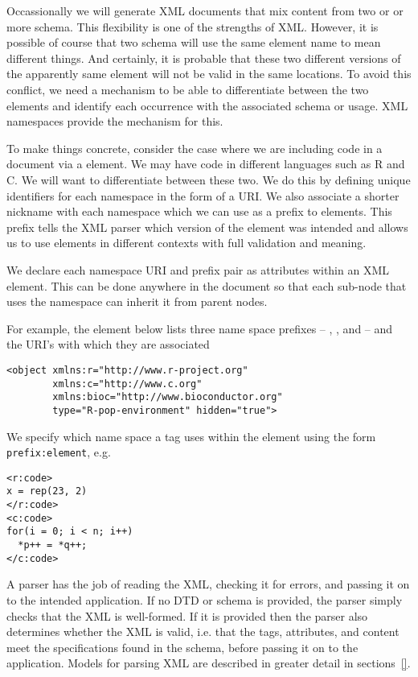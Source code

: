 Occassionally we will generate XML documents that mix content from two
or or more schema.  This flexibility is one of the strengths of XML.
However, it is possible of course that two schema will use the same
element name to mean different things.  And certainly, it is probable
that these two different versions of the apparently same element will
not be valid in the same locations.  To avoid this conflict, we need a
mechanism to be able to differentiate between the two elements and
identify each occurrence with the associated schema or usage.  XML
namespaces provide the mechanism for this.

To make things concrete, consider the case where we are including code
in a document via a  element.  We may have code in
different languages such as R and C.  We will want to differentiate
between these two.  We do this by defining unique identifiers for each
namespace in the form of a URI.  We also associate a shorter nickname
with each namespace which we can use as a prefix to elements.  This
prefix tells the XML parser which version of the element was intended
and allows us to use elements in different contexts with full
validation and meaning.

We declare each namespace URI and prefix pair as attributes within an
XML element.  This can be done anywhere in the document so that each
sub-node that uses the namespace can inherit it from parent nodes.

For example, the  element below lists three
name space prefixes -- , , and  -- and
the URI's with which they are associated
\begin{verbatim}
<object xmlns:r="http://www.r-project.org" 
        xmlns:c="http://www.c.org" 
        xmlns:bioc="http://www.bioconductor.org" 
        type="R-pop-environment" hidden="true">
\end{verbatim}
We specify which name space a tag uses within the 
element
using the form \verb+prefix:element+, e.g.
\begin{verbatim}
<r:code>
x = rep(23, 2)
</r:code>
<c:code>
for(i = 0; i < n; i++)
  *p++ = *q++;
</c:code>
\end{verbatim}

A parser has the job of reading the XML, checking it for errors, and
passing it on to the intended application.  If no DTD or schema is
provided, the parser simply checks that the XML is well-formed.  If it
is provided then the parser also determines whether the XML is valid,
i.e. that the tags, attributes, and content meet the specifications
found in the schema, before passing it on to the application.  Models for
parsing XML are described in greater detail in sections~\ref{}.

